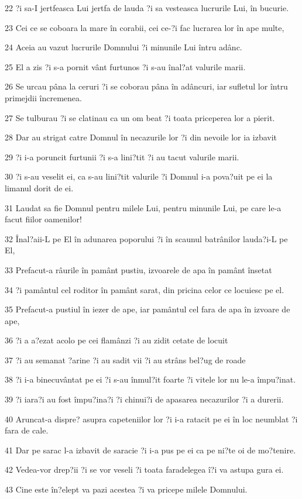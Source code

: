 \par 22 ?i sa-I jertfeasca Lui jertfa de lauda ?i sa vesteasca lucrurile Lui, în bucurie.
\par 23 Cei ce se coboara la mare în corabii, cei ce-?i fac lucrarea lor în ape multe,
\par 24 Aceia au vazut lucrurile Domnului ?i minunile Lui întru adânc.
\par 25 El a zis ?i s-a pornit vânt furtunos ?i s-au înal?at valurile marii.
\par 26 Se urcau pâna la ceruri ?i se coborau pâna în adâncuri, iar sufletul lor întru primejdii încremenea.
\par 27 Se tulburau ?i se clatinau ca un om beat ?i toata priceperea lor a pierit.
\par 28 Dar au strigat catre Domnul în necazurile lor ?i din nevoile lor ia izbavit
\par 29 ?i i-a poruncit furtunii ?i s-a lini?tit ?i au tacut valurile marii.
\par 30 ?i s-au veselit ei, ca s-au lini?tit valurile ?i Domnul i-a pova?uit pe ei la limanul dorit de ei.
\par 31 Laudat sa fie Domnul pentru milele Lui, pentru minunile Lui, pe care le-a facut fiilor oamenilor!
\par 32 Înal?aii-L pe El în adunarea poporului ?i în scaunul batrânilor lauda?i-L pe El,
\par 33 Prefacut-a râurile în pamânt pustiu, izvoarele de apa în pamânt însetat
\par 34 ?i pamântul cel roditor în pamânt sarat, din pricina celor ce locuiesc pe el.
\par 35 Prefacut-a pustiul în iezer de ape, iar pamântul cel fara de apa în izvoare de ape,
\par 36 ?i a a?ezat acolo pe cei flamânzi ?i au zidit cetate de locuit
\par 37 ?i au semanat ?arine ?i au sadit vii ?i au strâns bel?ug de roade
\par 38 ?i i-a binecuvântat pe ei ?i s-au înmul?it foarte ?i vitele lor nu le-a împu?inat.
\par 39 ?i iara?i au fost împu?ina?i ?i chinui?i de apasarea necazurilor ?i a durerii.
\par 40 Aruncat-a dispre? asupra capeteniilor lor ?i i-a ratacit pe ei în loc neumblat ?i fara de cale.
\par 41 Dar pe sarac l-a izbavit de saracie ?i i-a pus pe ei ca pe ni?te oi de mo?tenire.
\par 42 Vedea-vor drep?ii ?i se vor veseli ?i toata faradelegea î?i va astupa gura ei.
\par 43 Cine este în?elept va pazi acestea ?i va pricepe milele Domnului.

